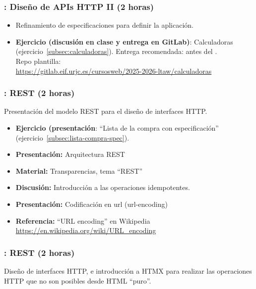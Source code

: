 \documentclass[a4paper,12pt]{article}
\begin{document}
\subsubsection{\martesF: Diseño de APIs HTTP II  (2 horas)}
\label{cal:martesF}

\begin{itemize}
\item Refinamiento de especificaciones para definir la aplicación.
\item \textbf{Ejercicio (discusión en clase y entrega en GitLab)}: Calculadoras (ejercicio~\ref{subsec:calculadoras}).
  Entrega recomendada: antes del \martesG. \\
  Repo plantilla: \\ {\footnotesize \url{https://gitlab.eif.urjc.es/cursosweb/2025-2026-ltaw/calculadoras}}
\end{itemize}


\subsubsection{\lunesG: REST (2 horas)}
\label{cal:lunesG}

Presentación del modelo REST para el diseño de interfaces HTTP.

\begin{itemize}
\item \textbf{Ejercicio (presentación}: ``Lista de la compra con especificación'' (ejercicio~\ref{subsec:lista-compra-spec}).
\item \textbf{Presentación:} Arquitectura REST
\item \textbf{Material:} Transparencias, tema ``REST''
\item \textbf{Discusión:} Introducción a las operaciones idempotentes.
\item \textbf{Presentación:} Codificación en url (url-encoding)
\item \textbf{Referencia:} ``URL encoding'' en Wikipedia \\ \url{https://en.wikipedia.org/wiki/URL_encoding}
\end{itemize}


\subsubsection{\martesG: REST (2 horas)}
\label{cal:martesG}

Diseño de interfaces HTTP, e introducción a HTMX para realizar las operaciones HTTP que no son posibles desde HTML ``puro''.
\end{document}
